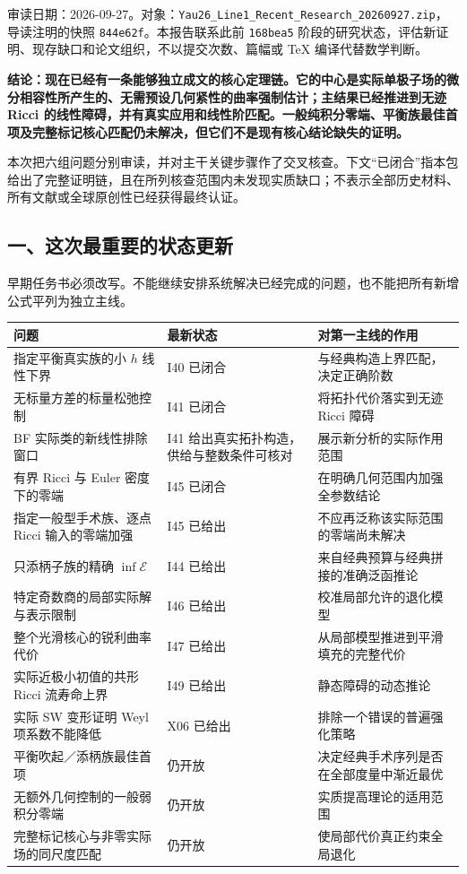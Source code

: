 \documentclass[
  10pt,
]{article}
\begin{document}
审读日期：2026-09-27。对象：\nolinkurl{Yau26_Line1_Recent_Research_20260927.zip}，导读注明的快照
\texttt{844e62f}。本报告联系此前 \texttt{168bea5}
阶段的研究状态，评估新证明、现存缺口和论文组织，不以提交次数、篇幅或 TeX
编译代替数学判断。

\textbf{结论：现在已经有一条能够独立成文的核心定理链。它的中心是实际单极子场的微分相容性所产生的、无需预设几何紧性的曲率强制估计；主结果已经推进到无迹
Ricci
的线性障碍，并有真实应用和线性阶匹配。一般纯积分零端、平衡族最佳首项及完整标记核心匹配仍未解决，但它们不是现有核心结论缺失的证明。}

本次把六组问题分别审读，并对主干关键步骤作了交叉核查。下文``已闭合''指本包给出了完整证明链，且在所列核查范围内未发现实质缺口；不表示全部历史材料、所有文献或全球原创性已经获得最终认证。

\hypertarget{ux4e00ux8fd9ux6b21ux6700ux91cdux8981ux7684ux72b6ux6001ux66f4ux65b0}{%
\subsection{一、这次最重要的状态更新}\label{ux4e00ux8fd9ux6b21ux6700ux91cdux8981ux7684ux72b6ux6001ux66f4ux65b0}}

早期任务书必须改写。不能继续安排系统解决已经完成的问题，也不能把所有新增公式平列为独立主线。

\begin{longtable}[]{@{}>{\raggedright\arraybackslash}p{\dimexpr(\linewidth-4\tabcolsep)/3\relax}>{\raggedright\arraybackslash}p{\dimexpr(\linewidth-4\tabcolsep)/3\relax}>{\raggedright\arraybackslash}p{\dimexpr(\linewidth-4\tabcolsep)/3\relax}@{}}
\toprule
问题 & 最新状态 & 对第一主线的作用\tabularnewline
\midrule
\endhead
指定平衡真实族的小 \(h\) 线性下界 & I40 已闭合 &
与经典构造上界匹配，决定正确阶数\tabularnewline
无标量方差的标量松弛控制 & I41 已闭合 & 将拓扑代价落实到无迹 Ricci
障碍\tabularnewline
BF 实际类的新线性排除窗口 & I41 给出真实拓扑构造，供给与整数条件可核对 &
展示新分析的实际作用范围\tabularnewline
有界 Ricci 与 Euler 密度下的零端 & I45 已闭合 &
在明确几何范围内加强全参数结论\tabularnewline
指定一般型手术族、逐点 Ricci 输入的零端加强 & I45 已给出 &
不应再泛称该实际范围的零端尚未解决\tabularnewline
只添柄子族的精确 \(\inf\mathcal E\) & I44 已给出 &
来自经典预算与经典拼接的准确泛函推论\tabularnewline
特定奇数商的局部实际解与表示限制 & I46 已给出 &
校准局部允许的退化模型\tabularnewline
整个光滑核心的锐利曲率代价 & I47 已给出 &
从局部模型推进到平滑填充的完整代价\tabularnewline
实际近极小初值的共形 Ricci 流寿命上界 & I49 已给出 &
静态障碍的动态推论\tabularnewline
实际 SW 变形证明 Weyl 项系数不能降低 & X06 已给出 &
排除一个错误的普遍强化策略\tabularnewline
平衡吹起／添柄族最佳首项 & 仍开放 &
决定经典手术序列是否在全部度量中渐近最优\tabularnewline
无额外几何控制的一般弱积分零端 & 仍开放 &
实质提高理论的适用范围\tabularnewline
完整标记核心与非零实际场的同尺度匹配 & 仍开放 &
使局部代价真正约束全局退化\tabularnewline
\bottomrule
\end{longtable}
\end{document}
